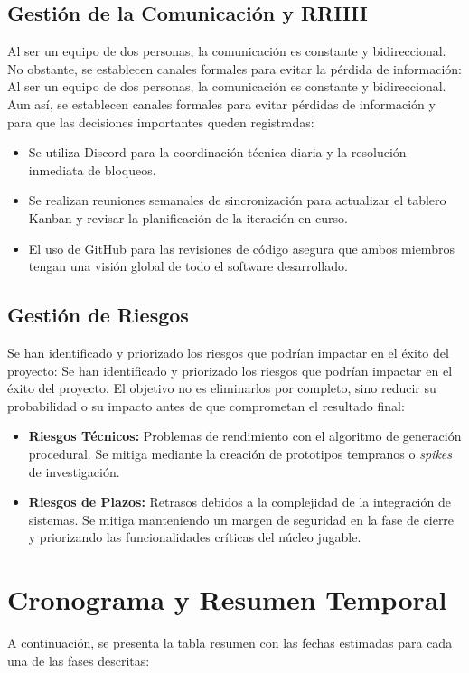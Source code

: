 \subsection{Gestión de la Comunicación y RRHH}
Al ser un equipo de dos personas, la comunicación es constante y bidireccional. No obstante, se establecen canales formales para evitar la pérdida de información:
Al ser un equipo de dos personas, la comunicación es constante y bidireccional. Aun así, se establecen canales formales para evitar pérdidas de información y para que las decisiones importantes queden registradas:
\begin{itemize}
    \item Se utiliza Discord para la coordinación técnica diaria y la resolución inmediata de bloqueos.
    \item Se realizan reuniones semanales de sincronización para actualizar el tablero Kanban y revisar la planificación de la iteración en curso.
    \item El uso de GitHub para las revisiones de código asegura que ambos miembros tengan una visión global de todo el software desarrollado.
\end{itemize}

\subsection{Gestión de Riesgos}
Se han identificado y priorizado los riesgos que podrían impactar en el éxito del proyecto:
Se han identificado y priorizado los riesgos que podrían impactar en el éxito del proyecto. El objetivo no es eliminarlos por completo, sino reducir su probabilidad o su impacto antes de que comprometan el resultado final:
\begin{itemize}
    \item \textbf{Riesgos Técnicos:} Problemas de rendimiento con el algoritmo de generación procedural. Se mitiga mediante la creación de prototipos tempranos o \textit{spikes} de investigación.
    \item \textbf{Riesgos de Plazos:} Retrasos debidos a la complejidad de la integración de sistemas. Se mitiga manteniendo un margen de seguridad en la fase de cierre y priorizando las funcionalidades críticas del núcleo jugable.
\end{itemize}

\section{Cronograma y Resumen Temporal}
A continuación, se presenta la tabla resumen con las fechas estimadas para cada una de las fases descritas:

